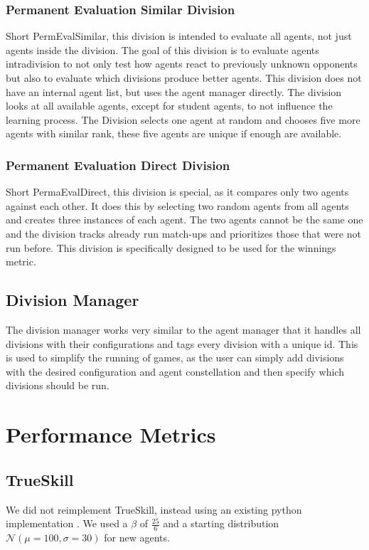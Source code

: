 \subsubsection{Permanent Evaluation Similar Division}
Short PermEvalSimilar, this division is intended to evaluate all agents, not just agents inside the division. The goal of this division is to evaluate agents intradivision to not only test how agents react to previously unknown opponents but also to evaluate which divisions produce better agents.
This division does not have an internal agent list, but uses the agent manager directly. The division looks at all available agents, except for student agents, to not influence the learning process. The Division selects one agent at random and chooses five more agents with similar rank, these five agents are unique if enough are available.

\subsubsection{Permanent Evaluation Direct Division}
Short PermaEvalDirect, this division is special, as it compares only two agents against each other. It does this by selecting two random agents from all agents and creates three instances of each agent. The two agents cannot be the same one and the division tracks already run match-ups and prioritizes those that were not run before. This division is specifically designed to be used for the winnings  metric.

\subsection{Division Manager}
The division manager works very similar to the agent manager that it handles all divisions with their configurations and tags every division with a unique id. This is used to simplify the running of games, as the user can simply add divisions with the desired configuration and agent constellation and then specify which divisions should be run.

\section{Performance Metrics}\label{PerformanceMetricsSection}

\subsection{TrueSkill}
We did not reimplement TrueSkill, instead using an existing python implementation \cite{TrueSkill_code}. We used a $\beta$ of $\frac{25}{6}$ and a starting distribution $\mathcal{N}(\mu=100, \sigma=30)$ for new agents.

